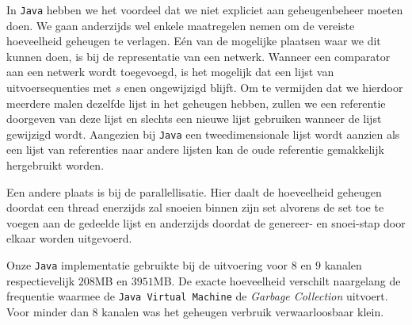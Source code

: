 \documentclass{article}
\begin{document}
In \texttt{Java} hebben we het voordeel dat we niet expliciet aan geheugenbeheer moeten doen.
We gaan anderzijds wel enkele maatregelen nemen om de vereiste hoeveelheid geheugen te verlagen.
E\'en van de mogelijke plaatsen waar we dit kunnen doen, is bij de representatie van een netwerk.
Wanneer een comparator aan een netwerk wordt toegevoegd, is het mogelijk dat een lijst van uitvoersequenties met $s$ enen ongewijzigd blijft.
Om te vermijden dat we hierdoor meerdere malen dezelfde lijst in het geheugen hebben, zullen we een referentie doorgeven van deze lijst en slechts een nieuwe lijst gebruiken wanneer de lijst gewijzigd wordt.
Aangezien bij \texttt{Java} een tweedimensionale lijst wordt aanzien als een lijst van referenties naar andere lijsten kan de oude referentie gemakkelijk hergebruikt worden. 

Een andere plaats is bij de parallellisatie.
Hier daalt de hoeveelheid geheugen doordat een thread enerzijds zal snoeien binnen zijn set alvorens de set toe te voegen aan de gedeelde lijst en anderzijds doordat de genereer- en snoei-stap door elkaar worden uitgevoerd.

Onze \texttt{Java} implementatie gebruikte bij de uitvoering voor $8$ en $9$ kanalen respectievelijk $208$MB en $3951$MB.
De exacte hoeveelheid verschilt naargelang de frequentie waarmee de \texttt{Java Virtual Machine} de \textit{Garbage Collection} uitvoert.
Voor minder dan $8$ kanalen was het geheugen verbruik verwaarloosbaar klein.
\end{document}
